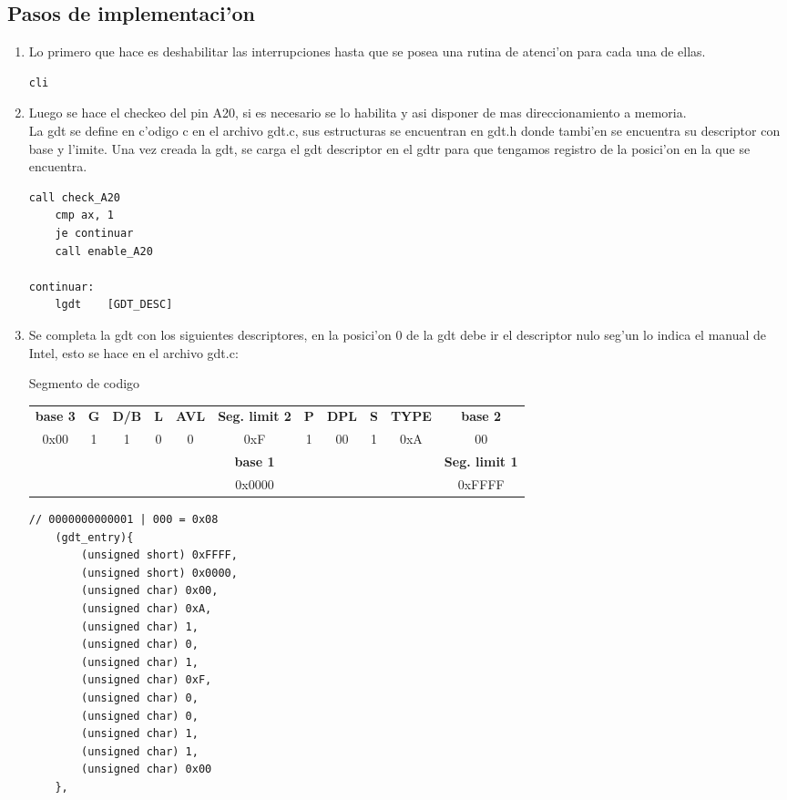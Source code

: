 \documentclass[11pt]{article}
\begin{document}
\subsection{Pasos de implementaci'on}
\begin{enumerate}
\item Lo primero que hace es deshabilitar las interrupciones hasta que se posea una rutina de atenci'on para cada una de ellas.
\begin{lstlisting}[frame=single]
	cli
\end{lstlisting}
\item 
Luego se hace el checkeo del pin A20, si es necesario se lo habilita y asi disponer de mas direccionamiento a memoria. \\ La gdt se define en c'odigo c en el archivo gdt.c, sus estructuras se encuentran en gdt.h donde tambi'en se encuentra su descriptor con base y l'imite. Una vez creada la gdt, se carga el gdt descriptor en el gdtr para que tengamos registro de la posici'on en la que se encuentra.
\begin{lstlisting}[frame=single]
	call check_A20	
 	cmp ax, 1
 	je continuar
	call enable_A20	

continuar:
	lgdt	[GDT_DESC]
\end{lstlisting}

\item Se completa la gdt con los siguientes descriptores, en la posici'on 0 de la gdt debe ir el descriptor nulo seg'un lo indica el manual de Intel, esto se hace en el archivo gdt.c:

\begin{center} Segmento de codigo
\begin{tabular}[t]{|c c c c c c|c c c c c|}
\hline
\textbf{base 3} & \textbf{G} & \textbf{D/B} & \textbf{L} & \textbf{AVL} & \textbf{Seg. limit 2} & \textbf{P} & \textbf{DPL} & \textbf{S} & \textbf{TYPE} & \textbf{base 2} \\
0x00 & 1 & 1 & 0 & 0 & 0xF & 1 & 00 & 1 & 0xA & 00 \\
\hline
& & & & & \textbf{base 1} & & & & & \textbf{Seg. limit 1} \\
& & & & & 0x0000 & & & & & 0xFFFF  \\
\hline
\end{tabular}
\end{center}
\begin{lstlisting}[frame=single]
// 0000000000001 | 000 = 0x08
	(gdt_entry){ 
		(unsigned short) 0xFFFF, 
		(unsigned short) 0x0000,
		(unsigned char) 0x00, 
		(unsigned char) 0xA, 
		(unsigned char) 1, 
		(unsigned char) 0, 
		(unsigned char) 1, 
		(unsigned char) 0xF,
		(unsigned char) 0,  
		(unsigned char) 0,  
		(unsigned char) 1,  
		(unsigned char) 1, 
		(unsigned char) 0x00 
	},
\end{lstlisting}


\end{enumerate}
\end{document}
